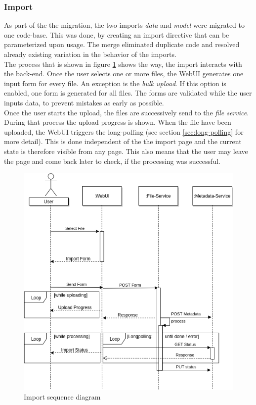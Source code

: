 \subsubsection{Import}
As part of the the migration, the two imports \textit{data} and \textit{model} were migrated to one code-base. This was done, by creating an import directive that can be parameterized upon usage. The merge eliminated duplicate code and resolved already existing variation in the behavior of the imports.\\
The process that is shown in figure \ref{fig:import} shows the way, the import interacts with the back-end. Once the user selects one or more files, the WebUI generates one input form for every file. An exception is the \textit{bulk upload}. If this option is enabled, one form is generated for all files. The forms are validated while the user inputs data, to prevent mistakes as early as possible.\\
Once the user starts the upload, the files are successively send to the \textit{file service}. During that process the upload progress is shown. When the file have been uploaded, the WebUI triggers the long-polling (see section \ref{sec:long-polling} for more detail). This is done independent of the the import page and the current state is therefore visible from any page. This also means that the user may leave the page and come back later to check, if the processing was successful.

\begin{figure}[H]
	\centering\includegraphics[width=.75\textwidth]{res/Import}
	\caption{Import sequence diagram}
	\label{fig:import}
\end{figure}


